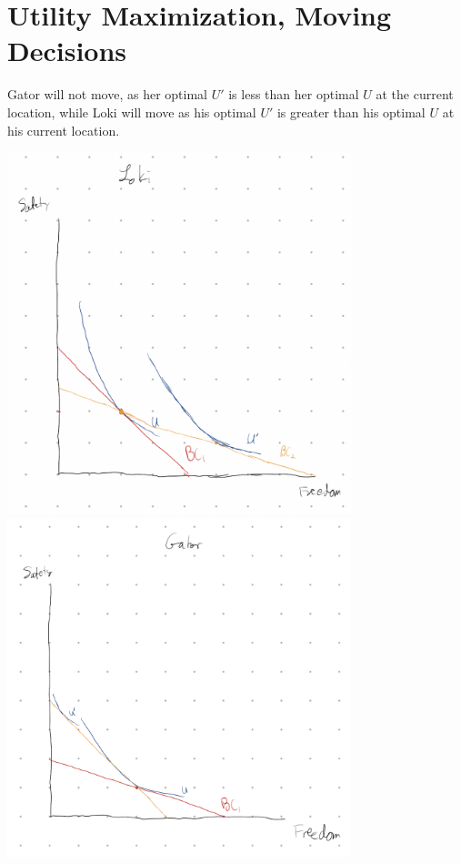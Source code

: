 \documentclass[8pt]{extarticle}
\begin{document}
{\section{Utility Maximization, Moving Decisions}
Gator will not move, as her optimal $ U' $ is less than her optimal $U$ at the current location, while Loki will move as his optimal $U'$ is greater than his optimal $U$ at his current location.
\begin{center}
	\includegraphics[width=10cm]{HW3Q12A}
	\includegraphics[width=10cm]{HW3Q12B}
\end{center}
}
\end{document}
